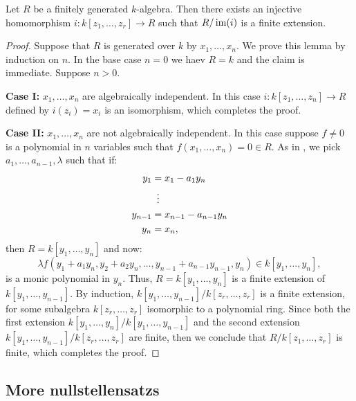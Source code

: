 \documentclass[11pt,a4paper]{article}
\begin{document}
\begin{lemma}
  Let $R$ be a finitely generated $k$-algebra.
  Then there exists an injective homomorphism
  $i \colon k[z_1,\dots,z_r] \to R$ such that
  $R / \operatorname{im}(i)$ is a finite extension.
\end{lemma}
\begin{proof}
  Suppose that $R$ is generated over $k$ by $x_1,\dots,x_n$.
  We prove this lemma by induction on $n$.
  In the base case $n = 0$ we haev $R = k$ and the claim is immediate.
  Suppose $n > 0$.

  \noindent
  \textbf{Case I:} $x_1,\dots,x_n$ are algebraically independent.
  In this case $i \colon k[z_1,\dots,z_n] \to R$ defined by $i(z_i) = x_i$
  is an isomorphism, which completes the proof.

  \noindent
  \textbf{Case II:} $x_1,\dots,x_n$ are not algebraically independent.
  In this case suppose $f \neq 0$ is a polynomial in $n$ variables
  such that $f(x_1,\dots,x_n) = 0 \in R$.
  As in , we pick $a_1,\dots,a_{n-1},\lambda$
  such that if:
  \begin{align*}
    y_1 &= x_1 - a_1 y_n \\
        &\vdotswithin{=} \\
    y_{n-1} &= x_{n-1} - a_{n-1} y_n \\
    y_n &= x_n,
  \end{align*}
  then $R = k[y_1,\dots,y_n]$ and now:
  \[
    \lambda f(y_1 + a_1 y_n, y_2 + a_2 y_n, \dots, y_{n-1} + a_{n-1} y_{n-1},y_n) \in k[y_1,\dots,y_n],
  \]
  is a monic polynomial in $y_n$.
  Thus, $R = k[y_1,\dots,y_n]$ is a finite extension of $k[y_1,\dots,y_{n-1}]$.
  By induction, $k[y_1,\dots,y_{n-1}]/k[z_r,\dots,z_r]$ is a finite
  extension, for some subalgebra $k[z_r,\dots,z_r]$ isomorphic to a polynomial
  ring.
  Since both the first extension $k[y_1,\dots,y_n]/k[y_1,\dots,y_{n-1}]$
  and the second extension $k[y_1,\dots,y_{n-1}]/k[z_r,\dots,z_r]$ are finite,
  then we conclude that $R/k[z_1,\dots,z_r]$ is finite,
  which completes the proof.
\end{proof}

\subsection{More nullstellensatzs}
\end{document}
